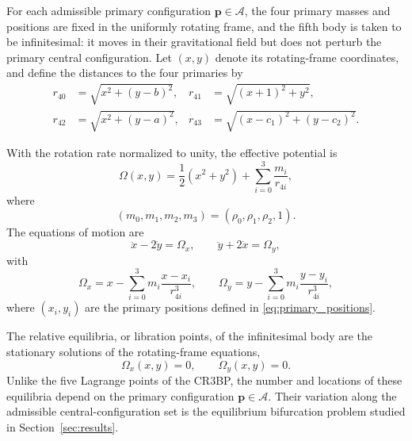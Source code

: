 For each admissible primary configuration
$\mathbf p\in\mathcal A$, the four primary masses and positions are fixed in
the uniformly rotating frame, and the fifth body is taken to be
infinitesimal: it moves in their gravitational field but does not perturb
the primary central configuration. Let $(x,y)$ denote its rotating-frame
coordinates, and define the distances to the four primaries by
\begin{equation}
\begin{aligned}
r_{40} &= \sqrt{x^2+(y-b)^2},
&
r_{41} &= \sqrt{(x+1)^2+y^2},
\\
r_{42} &= \sqrt{x^2+(y-a)^2},
&
r_{43} &= \sqrt{(x-c_1)^2+(y-c_2)^2}.
\end{aligned}
\label{eq:test_particle_distances}
\end{equation}

With the rotation rate normalized to unity, the effective potential is
\begin{equation}
\Omega(x,y)
=
\frac{1}{2}(x^2+y^2)
+
\sum_{i=0}^{3}\frac{m_i}{r_{4i}},
\label{eq:effective_potential}
\end{equation}
where
\[
(m_0,m_1,m_2,m_3)
=
(\rho_0,\rho_1,\rho_2,1).
\]
The equations of motion are
\begin{equation}
\ddot{x}-2\dot{y}=\Omega_x,
\qquad
\ddot{y}+2\dot{x}=\Omega_y,
\label{eq:equations_of_motion}
\end{equation}
with
\begin{equation}
\Omega_x
=
x-\sum_{i=0}^{3}m_i\frac{x-x_i}{r_{4i}^3},
\qquad
\Omega_y
=
y-\sum_{i=0}^{3}m_i\frac{y-y_i}{r_{4i}^3},
\label{eq:potential_gradient}
\end{equation}
where $(x_i,y_i)$ are the primary positions defined in
\eqref{eq:primary_positions}.

The relative equilibria, or libration points, of the infinitesimal body are
the stationary solutions of the rotating-frame equations,
\begin{equation}
\Omega_x(x,y)=0,
\qquad
\Omega_y(x,y)=0.
\label{eq:equilibrium_equations}
\end{equation}
Unlike the five Lagrange points of the CR3BP, the number and locations of
these equilibria depend on the primary configuration
$\mathbf p\in\mathcal A$. Their variation along the admissible
central-configuration set is the equilibrium bifurcation problem studied in
Section~\ref{sec:results}.

